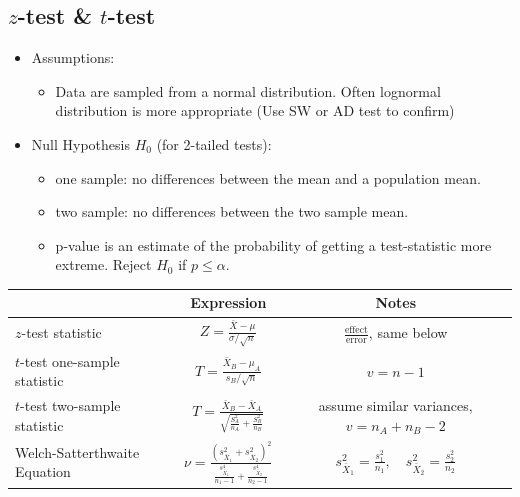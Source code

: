 \documentclass{article}
\begin{document}
\subsection*{$z$-test \& $t$-test}
\begin{itemize}
\item Assumptions:
    \begin{itemize}
        \item{Data are sampled from a normal distribution. Often lognormal distribution is more appropriate (Use SW or AD test to confirm)}
        \end{itemize}
    \item Null Hypothesis $H_{0}$ (for 2-tailed tests): 
    \begin{itemize}
        \item one sample: no differences between the mean and a population mean.
        \item two sample: no differences between the two sample mean. 
        \item p-value is an estimate of the probability of getting a test-statistic more extreme. Reject $H_{0}$ if $p \leq \alpha$.
    \end{itemize}
\end{itemize}
\begin{table}[H]
    \centering
    \begin{tabular}{l | c | c}\hline 
    & Expression & Notes \\ \hline
    $z$-test statistic &   $ \displaystyle Z = \frac{\bar{X}-\mu}{\sigma / \sqrt{n}}$ & $\displaystyle \frac{\text{effect}}{\text{error}}$, same below \\ [1.2em] \hline
    
    $t$-test one-sample statistic &   $ \displaystyle T = \frac{\bar{X}_{B}-\mu_{A}}{s_{B}/\sqrt{n}}$ & $v = n-1$\\ [1.2em] \hline 
    
    $t$-test two-sample statistic &   $ \displaystyle T = \frac{\bar{X}_{B}-\bar{X}_{A}}{\sqrt{\frac{S_{A}^{2}}{n_{A}}+\frac{S_{B}^{2}}{n_{B}}}}$ & assume similar variances, $v = n_{A}+n_{B}-2$\\ [1.5em] \hline 
    
    Welch-Satterthwaite Equation  & $\displaystyle \nu = \frac{(s_{\bar{X}_{1}}^{2}+s_{\bar{X}_{2}}^{2})^{2}}{\frac{s_{\bar{X}_{1}}^{4}}{n_{1}-1}+ \frac{s_{\bar{X}_{2}}^{4}}{n_{2}-1}}$ & $s_{\bar{X}_{1}}^{2} = \frac{s_{1}^{2}}{n_{1}}, \quad s_{\bar{X}_{2}}^{2} = \frac{s_{2}^{2}}{n_{2}}$
    \end{tabular}
\end{table} 
\end{document}
